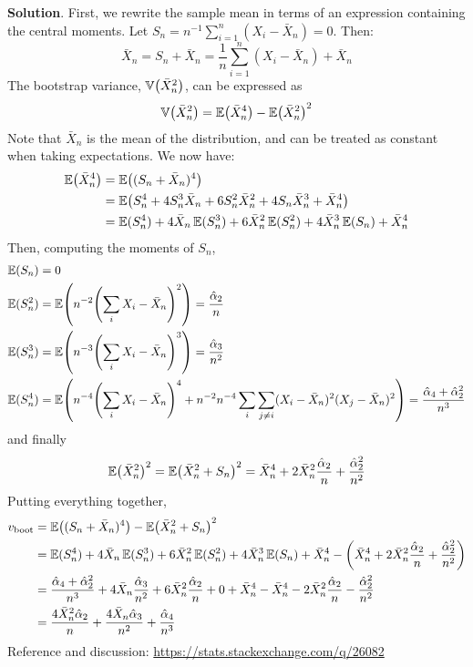 \textbf{Solution}.
First, we rewrite the sample mean in terms of an expression containing
the central moments. Let
\(S_{n} = n^{-1} \sum_{i=1}^{n} (X_{i} - \bar{X}_{n}) = 0\). Then:
\[
\bar{X}_{n} = S_{n} + \bar{X}_{n} = \frac{1}{n} \sum_{i=1}^{n} (X_{i} - \bar{X}_{n}) + \bar{X}_{n}
\]
The bootstrap variance, \(\VAR\left(\bar{X}_{n}^{2}\right)\), can
be expressed as
\[
\VAR\left(\bar{X}_{n}^{2}\right) = \EXP\left(\bar{X}_{n}^{4}\right) - \EXP\left(\bar{X}_{n}^{2}\right)^{2}
\]
Note that \(\bar{X}_{n}\) is the mean of the distribution, and can be
treated as constant when taking expectations.
We now have:
\begin{align*}
\EXP\left(\bar{X}_{n}^{4}\right) &= \EXP\left( (S_{n} + \bar{X}_{n})^{4} \right) \\
&= \EXP\left( S_{n}^{4} + 4 S_{n}^{3} \bar{X}_{n} + 6 S_{n}^{2} \bar{X}_{n}^{2} + 4 S_{n} \bar{X}_{n}^{3} + \bar{X}_{n}^{4} \right) \\
&= \EXP(S_{n}^{4}) + 4 \bar{X}_{n} \EXP(S_{n}^{3}) + 6 \bar{X}_{n}^{2} \EXP(S_{n}^{2}) + 4 \bar{X}_{n}^{3} \EXP(S_{n}) + \bar{X}_{n}^{4}
\end{align*}
Then, computing the moments of \(S_{n}\),
\begin{align*}
\EXP(S_{n}) &= 0 \\
\EXP(S_{n}^{2}) &= \EXP\left( n^{-2} \left( \sum_{i} X_{i} - \bar{X}_{n} \right)^{2} \right) = \frac{\hat{\alpha}_{2}}{n} \\
\EXP(S_{n}^{3}) &= \EXP\left( n^{-3} \left( \sum_{i} X_{i} - \bar{X}_{n} \right)^{3} \right) = \frac{\hat{\alpha}_{3}}{n^{2}} \\
\EXP(S_{n}^{4}) &= \EXP\left( n^{-4} \left( \sum_{i} X_{i} - \bar{X}_{n} \right)^{4} + n^{-2}n^{-4} \sum_{i} \sum_{j \neq i} (X_{i} - \bar{X}_{n})^{2} (X_{j} - \bar{X}_{n})^{2} \right) = \frac{\hat{\alpha}_{4} + \hat{\alpha}_{2}^{2}}{n^{3}}
\end{align*}
and finally
\[
\EXP\left(\bar{X}_{n}^{2}\right)^{2} = \EXP\left(\bar{X}_{n}^{2} + S_{n}\right)^{2} = \bar{X}_{n}^{4} + 2 \bar{X}_{n}^{2} \frac{\hat{\alpha}_{2}}{n} + \frac{\hat{\alpha}_{2}^{2}}{n^{2}}
\]
Putting everything together,
\begin{align*}
v_\text{boot} &= \EXP\left( (S_{n} + \bar{X}_{n})^{4} \right) - \EXP\left(\bar{X}_{n}^{2} + S_{n}\right)^{2} \\
&= \EXP(S_{n}^{4}) + 4 \bar{X}_{n} \EXP(S_{n}^{3}) + 6 \bar{X}_{n}^{2} \EXP(S_{n}^{2}) + 4 \bar{X}_{n}^{3} \EXP(S_{n}) + \bar{X}_{n}^{4} - \left( \bar{X}_{n}^{4} + 2 \bar{X}_{n}^{2} \frac{\hat{\alpha}_{2}}{n} + \frac{\hat{\alpha}_{2}^{2}}{n^{2}}\right) \\
&= \frac{\hat{\alpha}_{4} + \hat{\alpha}_{2}^{2}}{n^{3}} + 4 \bar{X}_{n} \frac{\hat{\alpha}_{3}}{n^{2}} + 6 \bar{X}_{n}^{2} \frac{\hat{\alpha}_{2}}{n} + 0 + \bar{X}_{n}^{4} - \bar{X}_{n}^{4} - 2 \bar{X}_{n}^{2} \frac{\hat{\alpha}_{2}}{n} - \frac{\hat{\alpha}_{2}^{2}}{n^{2}} \\
&= \frac{4 \bar{X}_{n}^{2} \hat{\alpha}_{2}}{n} + \frac{4 \bar{X}_{n} \hat{\alpha}_{3}}{n^{2}} + \frac{\hat{\alpha}_{4}}{n^{3}}
\end{align*}
Reference and discussion: \url{https://stats.stackexchange.com/q/26082}
